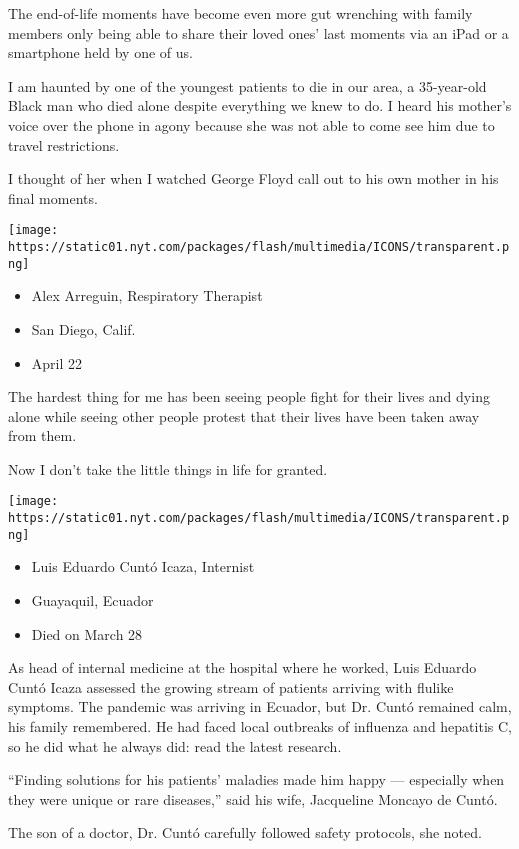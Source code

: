 The end-of-life moments have become even more gut wrenching with family
members only being able to share their loved ones' last moments via an
iPad or a smartphone held by one of us.

I am haunted by one of the youngest patients to die in our area, a
35-year-old Black man who died alone despite everything we knew to do. I
heard his mother's voice over the phone in agony because she was not
able to come see him due to travel restrictions.

I thought of her when I watched George Floyd call out to his own mother
in his final moments.

\texttt{[image: https://static01.nyt.com/packages/flash/multimedia/ICONS/transparent.png]}

\begin{itemize}
\tightlist
\item
  Alex Arreguin, Respiratory Therapist
\item
  San Diego, Calif.
\item
  April 22
\end{itemize}

The hardest thing for me has been seeing people fight for their lives
and dying alone while seeing other people protest that their lives have
been taken away from them.

Now I don't take the little things in life for granted.

\texttt{[image: https://static01.nyt.com/packages/flash/multimedia/ICONS/transparent.png]}

\begin{itemize}
\tightlist
\item
  Luis Eduardo Cuntó Icaza, Internist
\item
  Guayaquil, Ecuador
\item
  Died on March 28
\end{itemize}

As head of internal medicine at the hospital where he worked, Luis
Eduardo Cuntó Icaza assessed the growing stream of patients arriving
with flulike symptoms. The pandemic was arriving in Ecuador, but Dr.
Cuntó remained calm, his family remembered. He had faced local outbreaks
of influenza and hepatitis C, so he did what he always did: read the
latest research.

``Finding solutions for his patients' maladies made him happy ---
especially when they were unique or rare diseases,'' said his wife,
Jacqueline Moncayo de Cuntó.

The son of a doctor, Dr. Cuntó carefully followed safety protocols, she
noted.


